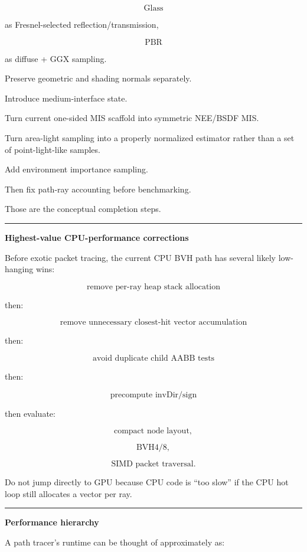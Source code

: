 \[
\text{Glass}
\]

as Fresnel-selected reflection/transmission,

\[
\text{PBR}
\]

as diffuse + GGX sampling.

Preserve geometric and shading normals separately.

Introduce medium-interface state.

Turn current one-sided MIS scaffold into symmetric NEE/BSDF MIS.

Turn area-light sampling into a properly normalized estimator rather than a set of point-light-like samples.

Add environment importance sampling.

Then fix path-ray accounting before benchmarking.

Those are the conceptual completion steps.

\begin{center}\rule{0.5\linewidth}{0.5pt}\end{center}

\textbf{Highest-value CPU-performance corrections}

Before exotic packet tracing, the current CPU BVH path has several likely low-hanging wins:

\[
\boxed{
\text{remove per-ray heap stack allocation}
}
\]

then:

\[
\boxed{
\text{remove unnecessary closest-hit vector accumulation}
}
\]

then:

\[
\boxed{
\text{avoid duplicate child AABB tests}
}
\]

then:

\[
\boxed{
\text{precompute invDir/sign}
}
\]

then evaluate:

\[
\text{compact node layout},
\]

\[
\text{BVH4/8},
\]

\[
\text{SIMD packet traversal}.
\]

Do not jump directly to GPU because CPU code is ``too slow'' if the CPU hot loop still allocates a vector per ray.

\begin{center}\rule{0.5\linewidth}{0.5pt}\end{center}

\textbf{Performance hierarchy}

A path tracer's runtime can be thought of approximately as:

